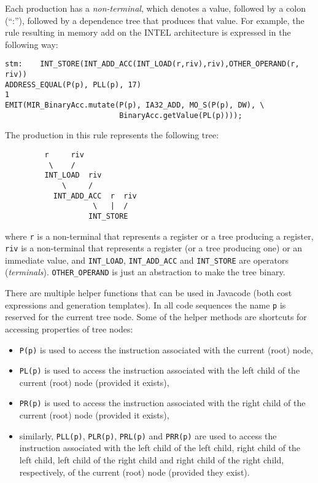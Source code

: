 Each production has a {\em non-terminal}, which denotes a value, followed
by a colon (``:''), followed by a dependence tree that produces that value.
For example, the rule resulting in memory add on the INTEL architecture is
expressed in the following way:
\begin{verbatim}
stm:    INT_STORE(INT_ADD_ACC(INT_LOAD(r,riv),riv),OTHER_OPERAND(r, riv))
ADDRESS_EQUAL(P(p), PLL(p), 17)
1
EMIT(MIR_BinaryAcc.mutate(P(p), IA32_ADD, MO_S(P(p), DW), \
                          BinaryAcc.getValue(PL(p))));
\end{verbatim}
The production in this rule represents the following tree:
\begin{verbatim}
         r     riv
          \    /
         INT_LOAD  riv
             \     /
           INT_ADD_ACC  r  riv
                    \   |  /
                   INT_STORE
\end{verbatim}
where {\tt r} is a non-terminal that represents a register or a tree
producing a register, {\tt riv} is a non-terminal that represents a register
(or a tree producing one) or an immediate value, and {\tt INT\_LOAD},
{\tt INT\_ADD\_ACC} and {\tt INT\_STORE} are operators ({\em terminals}).
{\tt OTHER\_OPERAND} is just an abstraction to make the tree binary.

There are multiple helper functions that can be used in Java\trademark code (both cost
expressions and generation templates).  In all code sequences the name
{\tt p} is reserved for the current tree node.  Some of the helper methods
are shortcuts for accessing properties of tree nodes:
\begin{itemize}
\item {\tt P(p)} is used to access the instruction associated with the
current (root) node,
\item {\tt PL(p)} is used to access the instruction associated with the left
child of the current (root) node (provided it exists),
\item {\tt PR(p)} is used to access the instruction associated with the
right child of the current (root) node (provided it exists),
\item similarly, {\tt PLL(p)}, {\tt PLR(p)}, {\tt PRL(p)} and {\tt PRR(p)}
are used to access the instruction associated with the
left child of the left child, right child of the left child, left child of
the right child and right child of the right child, respectively, of the
current (root) node (provided they exist).
\end{itemize}

